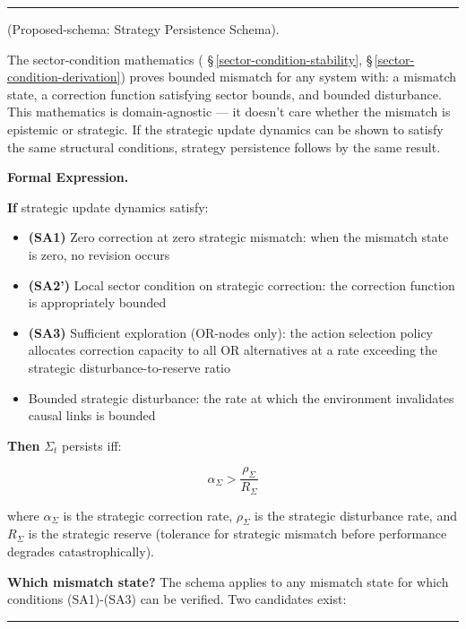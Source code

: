 \documentclass[11pt,oneside]{article}
\newcounter{claim}[section]
\renewcommand{\theclaim}{\thesection.\arabic{claim}}
\newenvironment{segment}[2]{%
  \refstepcounter{claim}%
  \bigskip\noindent\hrule\smallskip
  \noindent{\bfseries #1~\theclaim}\enskip(#2).\par\smallskip
  \noindent\ignorespaces
}{%
  \par\smallskip\noindent\hrule\bigskip
}
\newenvironment{remark}[1][]{\begin{segment}{Remark}{#1}}{\end{segment}}
\begin{document}
\begin{remark}[Proposed-schema: Strategy Persistence Schema]
\label{strategy-persistence-schema}
The sector-condition mathematics ( \S\,\ref{sector-condition-stability}, \S\,\ref{sector-condition-derivation}) proves bounded mismatch for any system with: a mismatch state, a correction function satisfying sector bounds, and bounded disturbance. This mathematics is domain-agnostic — it doesn't care whether the mismatch is epistemic or strategic. If the strategic update dynamics can be shown to satisfy the same structural conditions, strategy persistence follows by the same result.



\medskip\noindent\textbf{Formal Expression.}



\textbf{If} strategic update dynamics satisfy:
\begin{itemize}
  \item \textbf{(SA1)} Zero correction at zero strategic mismatch: when the mismatch state is zero, no revision occurs
  \item \textbf{(SA2')} Local sector condition on strategic correction: the correction function is appropriately bounded
  \item \textbf{(SA3)} Sufficient exploration (OR-nodes only): the action selection policy allocates correction capacity to all OR alternatives at a rate exceeding the strategic disturbance-to-reserve ratio
  \item Bounded strategic disturbance: the rate at which the environment invalidates causal links is bounded
\end{itemize}


\textbf{Then} $\Sigma_t$ persists iff:

$$\alpha_\Sigma > \frac{\rho_\Sigma}{R_\Sigma}$$

where $\alpha_\Sigma$ is the strategic correction rate, $\rho_\Sigma$ is the strategic disturbance rate, and $R_\Sigma$ is the strategic reserve (tolerance for strategic mismatch before performance degrades catastrophically).

\textbf{Which mismatch state?} The schema applies to any mismatch state for which conditions (SA1)-(SA3) can be verified. Two candidates exist:


\end{remark}
\end{document}
